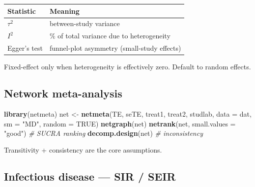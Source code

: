 \documentclass[
]{article}
\newenvironment{Shaded}{\begin{snugshade}}{\end{snugshade}}
\newcommand{\AttributeTok}[1]{\textcolor[rgb]{0.13,0.29,0.53}{#1}}
\newcommand{\CommentTok}[1]{\textcolor[rgb]{0.56,0.35,0.01}{\textit{#1}}}
\newcommand{\ConstantTok}[1]{\textcolor[rgb]{0.56,0.35,0.01}{#1}}
\newcommand{\FunctionTok}[1]{\textcolor[rgb]{0.13,0.29,0.53}{\textbf{#1}}}
\newcommand{\NormalTok}[1]{#1}
\newcommand{\OtherTok}[1]{\textcolor[rgb]{0.56,0.35,0.01}{#1}}
\newcommand{\StringTok}[1]{\textcolor[rgb]{0.31,0.60,0.02}{#1}}
\newcounter{none} %
\begin{document}
{\def\LTcaptype{none} %
\begin{longtable}[]{@{}ll@{}}
\toprule\noalign{}
Statistic & Meaning \\
\midrule\noalign{}
\endhead
\bottomrule\noalign{}
\endlastfoot
\(\tau^2\) & between-study variance \\
\(I^2\) & \% of total variance due to heterogeneity \\
Egger's test & funnel-plot asymmetry (small-study effects) \\
\end{longtable}
}

Fixed-effect only when heterogeneity is effectively zero. Default to
random effects.

\subsection{Network meta-analysis}\label{network-meta-analysis}

\begin{Shaded}
\begin{Highlighting}[]
\FunctionTok{library}\NormalTok{(netmeta)}
\NormalTok{net }\OtherTok{\textless{}{-}} \FunctionTok{netmeta}\NormalTok{(TE, seTE, treat1, treat2, studlab,}
               \AttributeTok{data =}\NormalTok{ dat, }\AttributeTok{sm =} \StringTok{"MD"}\NormalTok{, }\AttributeTok{random =} \ConstantTok{TRUE}\NormalTok{)}
\FunctionTok{netgraph}\NormalTok{(net)}
\FunctionTok{netrank}\NormalTok{(net, }\AttributeTok{small.values =} \StringTok{"good"}\NormalTok{)    }\CommentTok{\# SUCRA ranking}
\FunctionTok{decomp.design}\NormalTok{(net)                     }\CommentTok{\# inconsistency}
\end{Highlighting}
\end{Shaded}

Transitivity + consistency are the core assumptions.

\subsection{Infectious disease --- SIR /
SEIR}\label{infectious-disease-sir-seir}
\end{document}
